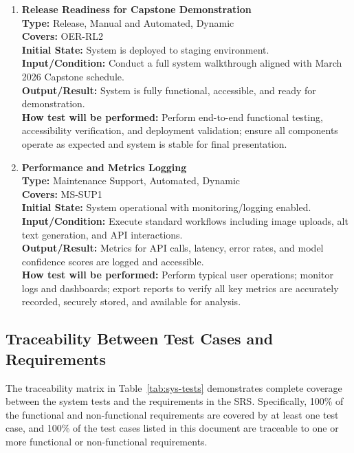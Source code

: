 \documentclass[12pt, titlepage]{article}
\begin{document}
\begin{enumerate}[label=NFR-ST \arabic*., wide=0pt, leftmargin=*]
  \item \textbf{Release Readiness for Capstone Demonstration} \\[2mm]
    \textbf{Type:} Release, Manual and Automated, Dynamic \\
    \textbf{Covers:} OER-RL2 \\
    \textbf{Initial State:} System is deployed to staging environment. \\
    \textbf{Input/Condition:} Conduct a full system walkthrough aligned
    with March 2026 Capstone schedule. \\
    \textbf{Output/Result:} System is fully functional, accessible, and
    ready for demonstration. \\[2mm]
    \textbf{How test will be performed:}
    Perform end-to-end functional testing, accessibility
    verification, and deployment validation; ensure all components
    operate as expected and system is stable for final presentation.

  \item \textbf{Performance and Metrics Logging} \\[2mm]
    \textbf{Type:} Maintenance Support, Automated, Dynamic \\
    \textbf{Covers:} MS-SUP1 \\
    \textbf{Initial State:} System operational with
    monitoring/logging enabled. \\
    \textbf{Input/Condition:} Execute standard workflows including
    image uploads, alt text generation, and API interactions. \\
    \textbf{Output/Result:} Metrics for API calls, latency, error
    rates, and model confidence scores are logged and accessible. \\[2mm]
    \textbf{How test will be performed:}
    Perform typical user operations; monitor logs and dashboards;
    export reports to verify all key metrics are accurately recorded,
    securely stored, and available for analysis.

\end{enumerate}

\subsection{Traceability Between Test Cases and Requirements}
\noindent The traceability matrix in Table~\ref{tab:sys-tests} demonstrates complete coverage between the system tests and the requirements in the SRS. Specifically, 100\% of the functional and non-functional requirements are covered by at least one test case, and 100\% of the test cases listed in this document are traceable to one or more functional or non-functional requirements.
\end{document}
